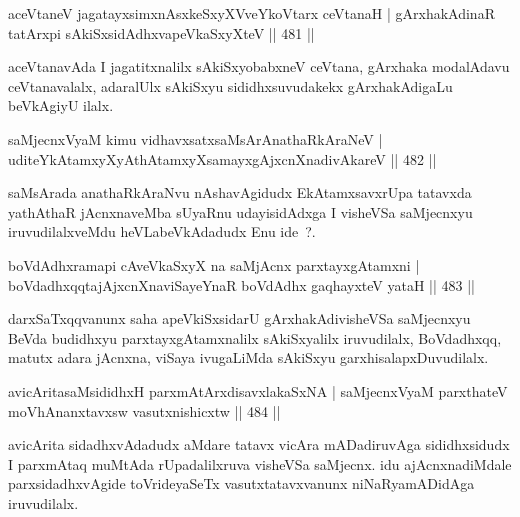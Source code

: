 \begin{shl}
aceVtaneV jagatayxsimxnAsxkeSxyXVveYkoV\s tarx ceVtanaH |
gArxhakAdinaR tatArxpi sAkiSxsidAdhxvapeVkaSxyXteV \hfill || 481 ||
\end{shl}

\begin{artha}
aceVtanavAda I jagatitxnalilx sAkiSxyobabxneV ceVtana, gArxhaka modalAdavu ceVtanavalalx, adaralUlx sAkiSxyu sididhxsuvudakekx gArxhakAdigaLu beVkAgiyU ilalx.
\end{artha}

\begin{shl}
saMjecnxVyaM kimu vidhavxsatxsaMsArAnathaRkAraNeV |
uditeYkAtamxyXyAthAtamxyXsamayxgAjxcnXnadivAkareV \hfill || 482 ||
\end{shl}

\begin{artha}
saMsArada anathaRkAraNvu nAshavAgidudx EkAtamxsavxrUpa tatavxda yathAthaR jAcnxnaveMba sUyaRnu udayisidAdxga I visheVSa saMjecnxyu iruvudilalxveMdu heVLabeVkAdadudx Enu ide~?.
\end{artha}


\begin{shl}
boVdAdhxramapi cAveVkaSxyX na saMjAcnx parxtayxgAtamxni |
boVdadhxqqtajAjxcnXnaviSayeYnaR boVdAdhx gaqhayxteV yataH \hfill || 483 ||
\end{shl}

\begin{artha}
darxSaTxqqvanunx saha apeVkiSxsidarU gArxhakAdivisheVSa saMjecnxyu BeVda budidhxyu parxtayxgAtamxnalilx sAkiSxyalilx iruvudilalx, BoVdadhxqq, matutx adara jAcnxna, viSaya ivugaLiMda sAkiSxyu garxhisalapxDuvudilalx.
\end{artha}


\begin{shl}
avicAritasaMsididhxH parxmAtArxdisavxlakaSxNA |
saMjecnxVyaM parxthateV moVhAnanxtavxsw vasutxnishicxtw \hfill || 484 ||
\end{shl}

\begin{artha}
avicArita sidadhxvAdadudx aMdare tatavx vicAra mADadiruvAga sididhxsidudx I parxmAtaq muMtAda rUpadalilxruva visheVSa saMjecnx. idu ajAcnxnadiMdale parxsidadhxvAgide toVrideyaSeTx vasutxtatavxvanunx niNaRyamADidAga iruvudilalx.
\end{artha}

